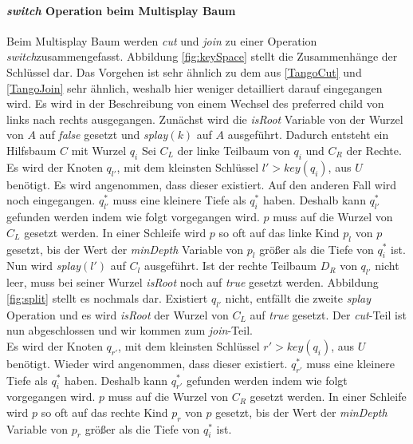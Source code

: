 \documentclass[a4paper,12pt]{article}
\begin{document}
\paragraph{\textit{switch} Operation beim Multisplay Baum}
Beim Multisplay Baum werden \textit{cut} und \textit{join} zu einer Operation \textit{switch}zusammengefasst. Abbildung \ref{fig:keySpace} stellt die Zusammenhänge der Schlüssel dar. Das Vorgehen ist sehr ähnlich zu dem aus \ref{TangoCut} und  \ref{TangoJoin} sehr ähnlich, weshalb hier weniger detailliert darauf eingegangen wird. Es wird in der Beschreibung von einem Wechsel des preferred child von links nach rechts ausgegangen.
Zunächst wird die \textit{isRoot} Variable von der Wurzel von $A$ auf \textit{false} gesetzt und \textit{splay}$\left(k\right)$ auf $A$ ausgeführt. Dadurch entsteht ein Hilfsbaum $C$ mit Wurzel $q_i$ Sei $C_L$ der linke Teilbaum von $q_i$ und $C_R$ der Rechte.\\
 Es wird der Knoten $q_{l'}$, mit dem kleinsten Schlüssel $l' > \textit{key}\left(q_i\right)$, aus $U$ benötigt. Es wird angenommen, dass dieser existiert. Auf den anderen Fall wird noch eingegangen. $q_{l'}^*$ muss eine kleinere Tiefe als  $q_i^*$ haben. Deshalb kann $q_{l'}^*$ gefunden werden indem  wie folgt vorgegangen wird. $p$ muss auf die Wurzel von $C_L$ gesetzt werden. In einer Schleife wird $p$ so oft auf das linke Kind $p_l$ von $p$ gesetzt, bis der Wert der \textit{minDepth} Variable von $p_l$ größer als die Tiefe von $q_i^*$  ist.\\
 Nun wird \textit{splay}$\left(l'\right)$ auf $C_l$ ausgeführt. Ist der rechte Teilbaum $D_R$ von $q_{l'}$ nicht leer,  muss bei seiner Wurzel \textit{isRoot} noch auf \textit{true} gesetzt werden. Abbildung \ref{fig:split} stellt es nochmals dar. Existiert  $q_{l'}$ nicht, entfällt die zweite \textit{splay} Operation und es wird \textit{isRoot} der Wurzel von $C_L$ auf \textit{true} gesetzt. Der \textit{cut}-Teil ist nun abgeschlossen und wir kommen zum \textit{join}-Teil. \\
 Es wird der Knoten $q_{r'}$, mit dem kleinsten Schlüssel $r' > \textit{key}\left(q_i\right)$, aus $U$ benötigt. Wieder wird angenommen, dass dieser existiert.  $q_{r'}^*$ muss eine kleinere Tiefe als  $q_i^*$ haben. Deshalb kann $q_{r'}^*$ gefunden werden indem  wie folgt vorgegangen wird. $p$ muss auf die Wurzel von $C_R$ gesetzt werden. In einer Schleife wird $p$ so oft auf das rechte Kind $p_r$ von $p$ gesetzt, bis der Wert der \textit{minDepth} Variable von $p_r$ größer als die Tiefe von $q_i^*$  ist.\\
\end{document}
